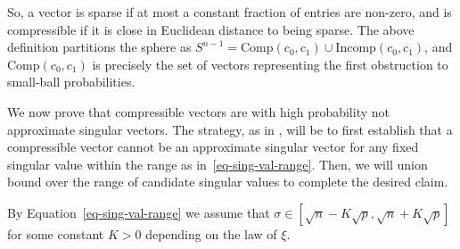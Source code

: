 \documentclass[11pt]{article}
\numberwithin{equation}{section}
\theoremstyle{remark}
\newcommand{\Comp}{\mathrm{Comp}}
\newcommand{\Incomp}{\mathrm{Incomp}}
\begin{document}
So, a vector is sparse if at most a constant fraction of entries are non-zero, and is compressible if it is close in Euclidean distance to being sparse. The above definition partitions the sphere as $S^{n - 1} = \Comp(c_0, c_1) \cup \Incomp(c_0, c_1)$, and $\Comp(c_0, c_1)$ is precisely the set of vectors representing the first obstruction to small-ball probabilities.

We now prove that compressible vectors are with high probability not approximate singular vectors. The strategy, as in \cite{christoffersen2025gaps}, will be to first establish that a compressible vector cannot be an approximate singular vector for any fixed singular value within the range as in~\cref{eq-sing-val-range}. Then, we will union bound over the range of candidate singular values to complete the desired claim.

By Equation~\ref{eq-sing-val-range} we assume that $\sigma \in [\sqrt{n} - K\sqrt{p}, \sqrt{n} + K\sqrt{p}]$ for some constant $K > 0$ depending on the law of $\xi$.
\end{document}

